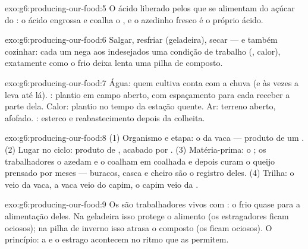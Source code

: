 \begin{solution}{exo:g6:producing-our-food:5}
O ácido liberado pelos  que se alimentam do açúcar do :
o ácido engrossa e coalha o , e o azedinho fresco é o próprio
ácido.
\end{solution}

\begin{solution}{exo:g6:producing-our-food:6}
Salgar, resfriar (geladeira), secar --- e também cozinhar: cada um
nega aos  indesejados uma condição de trabalho (,
calor), exatamente como o frio deixa lenta uma pilha de composto.
\end{solution}

\begin{solution}{exo:g6:producing-our-food:7}
Água: quem cultiva conta com a chuva (e às vezes a leva até lá). :
plantio em campo aberto, com espaçamento para cada  receber a
parte dela. Calor: plantio no tempo da estação quente. Ar: terreno
aberto,  afofado. : esterco e reabastecimento depois
da colheita.
\end{solution}

\begin{solution}{exo:g6:producing-our-food:8}
(1) Organismo e etapa: o  da vaca --- produto de um .
(2) Lugar no ciclo: produto de , acabado por .
(3) Matéria-prima: o ; os trabalhadores o azedam e o coalham em
coalhada e depois curam o queijo prensado por meses --- buracos, casca
e cheiro são o registro deles. (4) Trilha: o  veio da vaca, a
vaca veio do capim, o capim veio da .
\end{solution}

\begin{solution}{exo:g6:producing-our-food:9}
Os  são trabalhadores vivos com : o frio quase para
a alimentação deles. Na geladeira isso protege o alimento (os
estragadores ficam ociosos); na pilha de inverno isso atrasa o
composto (os  ficam ociosos). O princípio: a
 e o estrago acontecem no ritmo que as 
permitem.
\end{solution}

